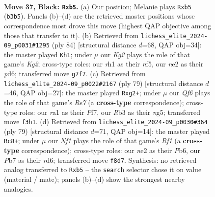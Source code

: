 \documentclass[11pt]{article}
\begin{document}
\clearpage

\begin{figure}[p]\centering
\begin{subfigure}{0.46\textwidth}\centering
\resizebox{\linewidth}{!}{%
\newchessgame
\chessboard[
  setfen={5n2/pp4kp/7p/1P6/3P4/1r3q2/2Q1N3/R5KR b - - 10 37},
  showmover=false,
  pgfstyle=straightmove, color=movearrow, markmove={b3-b5}
]}
\caption{}
\end{subfigure}\hfill
\begin{subfigure}{0.46\textwidth}\centering
\resizebox{\linewidth}{!}{%
\newchessgame
\chessboard[
  setfen={5r1k/7p/1p1p4/1P2qn2/1P6/3Q2P1/6KP/3R4 w - - 2 43},
  showmover=false,
  pgfstyle=straightmove, color=movearrow, markmove={g2-h1}
]}
\caption{}
\end{subfigure}
\\[4pt]
\begin{subfigure}{0.46\textwidth}\centering
\resizebox{\linewidth}{!}{%
\newchessgame
\chessboard[
  setfen={6k1/2p2pp1/6p1/6Nq/3Q4/pP5P/P3r1R1/6K1 b - - 0 40},
  showmover=false,
  pgfstyle=straightmove, color=movearrow, markmove={e2-g2}
]}
\caption{}
\end{subfigure}\hfill
\begin{subfigure}{0.46\textwidth}\centering
\resizebox{\linewidth}{!}{%
\newchessgame
\chessboard[
  setfen={5rk1/Q4pp1/1p1Rp2p/1N6/P7/8/2K5/2R2q2 b - - 13 40},
  showmover=false,
  pgfstyle=straightmove, color=movearrow, markmove={f8-c8}
]}
\caption{}
\end{subfigure}
\caption{\textbf{Move 37, Black: \texttt{Rxb5}.} (a) Our position; Melanie plays \texttt{Rxb5} (\texttt{b3b5}). Panels (b)--(d) are the retrieved master positions whose correspondence most drove this move (highest QAP objective among those that transfer to it). (b) Retrieved from \texttt{lichess\_elite\_2024-09\_p0031\#1295} (ply 84) [structural distance $d$=68, QAP obj=34]: the master played \texttt{Kh1}; under $\mu$ our \emph{Kg2} plays the role of that game's \emph{Kg2}; cross-type roles: our \emph{r}h1 as their \emph{n}f5, our \emph{n}e2 as their \emph{p}d6; transferred move \texttt{g7f7}. (c) Retrieved from \texttt{lichess\_elite\_2024-09\_p0022\#2167} (ply 79) [structural distance $d$=46, QAP obj=27]: the master played \texttt{Rxg2+}; under $\mu$ our \emph{Qf6} plays the role of that game's \emph{Re7} (a \textbf{cross-type} correspondence); cross-type roles: our \emph{r}a1 as their \emph{P}f7, our \emph{R}b3 as their \emph{n}g5; transferred move \texttt{f3h1}. (d) Retrieved from \texttt{lichess\_elite\_2024-09\_p0030\#364} (ply 79) [structural distance $d$=71, QAP obj=14]: the master played \texttt{Rc8+}; under $\mu$ our \emph{Nf1} plays the role of that game's \emph{Rf1} (a \textbf{cross-type} correspondence); cross-type roles: our \emph{n}e2 as their \emph{P}b6, our \emph{P}b7 as their \emph{r}d6; transferred move \texttt{f8d7}. Synthesis: no retrieved analog transferred to \texttt{Rxb5} -- the \texttt{search} selector chose it on value (material / mate); panels (b)--(d) show the strongest nearby analogies.}
\label{fig:thought-m73}
\end{figure}
\end{document}
